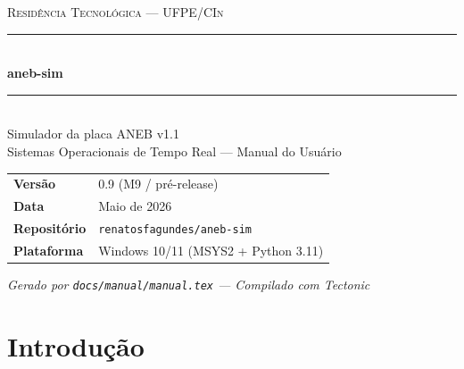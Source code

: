 \documentclass[12pt,a4paper]{article}
\begin{document}
\begin{titlepage}
  \pagecolor{verdeescuro}
  \color{white}
  \vspace*{2cm}

  \begin{center}
    {\fontsize{11}{13}\selectfont\scshape Residência Tecnológica --- UFPE/CIn}\\[0.8cm]
    \rule{\linewidth}{1.5pt}\\[0.6cm]
    {\fontsize{28}{34}\selectfont\bfseries aneb-sim}\\[0.4cm]
    \rule{\linewidth}{1.5pt}\\[0.8cm]
    {\fontsize{15}{18}\selectfont Simulador da placa ANEB v1.1}\\[0.3cm]
    {\fontsize{12}{15}\selectfont\color{verdeclaro}%
      Sistemas Operacionais de Tempo Real --- Manual do Usuário}\\[2.5cm]
  \end{center}

  \begin{tcolorbox}[
    colback=white, colframe=white,
    coltext=verdeescuro,
    width=0.75\textwidth,
    center, arc=3pt,
    left=10pt, right=10pt, top=6pt, bottom=6pt
  ]
    \small
    \begin{tabular}{@{}ll@{}}
      \textbf{Versão}          & 0.9 (M9 / pré-release) \\
      \textbf{Data}            & Maio de 2026 \\
      \textbf{Repositório}     & \texttt{renatosfagundes/aneb-sim} \\
      \textbf{Plataforma}      & Windows 10/11 (MSYS2 + Python 3.11) \\
    \end{tabular}
  \end{tcolorbox}

  \vfill
  {\small\itshape Gerado por \texttt{docs/manual/manual.tex} --- Compilado com Tectonic}
\end{titlepage}
\pagecolor{white}
\color{black}

\tableofcontents
\newpage

\section{Introdução}
\end{document}
